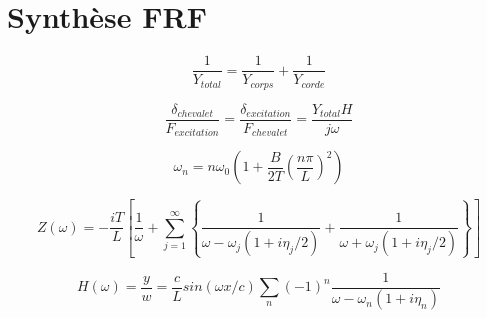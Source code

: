 
\section{Synthèse FRF}

\begin{equation}
  \frac{1}{Y_{total}} = \frac{1}{Y_{corps}} + \frac{1}{Y_{corde}}
  \label{eq:eq_frf_1}
\end{equation}

\begin{equation}
  \frac{\delta_{chevalet}}{F_{excitation}} = \frac{\delta_{excitation}}{F_{chevalet}} = \frac{Y_{total}H}{j\omega}
  \label{eq:eq_frf_2}
\end{equation}

\begin{equation}
	\omega_n = n\omega_0(1+\frac{B}{2T}(\frac{n\pi}{L})^2)
 \label{eq:eq_frf_3}
\end{equation}


\begin{equation}
 Z(\omega) = -\frac{iT}{L} \left[ \frac{1}{\omega} + \sum_{j=1}^{\infty} \left\lbrace \frac{1}{\omega - \omega_j (1+ i\eta_j/2)} + \frac{1}{\omega + \omega_j (1+ i\eta_j/2)} \right\rbrace  \right]
  \label{eq:eq_frf_4}
\end{equation}

\begin{equation}
H(\omega) = \frac{y}{w} = \frac{c}{L} sin(\omega x/c )\sum_n (-1)^n \frac{1}{\omega - \omega_n(1 + i\eta_n)}
  \label{eq:eq_frf_5}
\end{equation}


